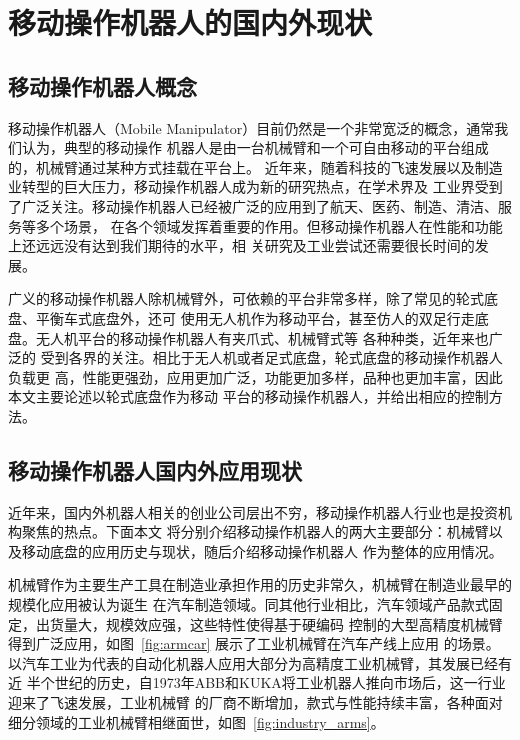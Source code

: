 
\chapter{移动操作机器人的国内外现状}
\label{cha:intro}

\section{移动操作机器人概念}
\label{cha:base_comcept}

移动操作机器人（Mobile Manipulator）目前仍然是一个非常宽泛的概念，通常我们认为，典型的移动操作
机器人是由一台机械臂和一个可自由移动的平台组成的，机械臂通过某种方式挂载在平台上\cite{bostelman2016survey}。
近年来，随着科技的飞速发展以及制造业转型的巨大压力，移动操作机器人成为新的研究热点，在学术界及
工业界受到了广泛关注\cite{schneier2015literature}。移动操作机器人已经被广泛的应用到了航天\cite{ambrose2004mobile}、医药、制造\cite{guizzo2011meka}、清洁、服务等多个场景，
在各个领域发挥着重要的作用。但移动操作机器人在性能和功能上还远远没有达到我们期待的水平，相
关研究及工业尝试还需要很长时间的发展。

广义的移动操作机器人除机械臂外，可依赖的平台非常多样，除了常见的轮式底盘、平衡车式底盘外，还可
使用无人机作为移动平台，甚至仿人的双足行走底盘。无人机平台的移动操作机器人有夹爪式、机械臂式等
各种种类，近年来也广泛的
受到各界的关注\cite{ruggiero2018aerial}。相比于无人机或者足式底盘，轮式底盘的移动操作机器人负载更
高，性能更强劲，应用更加广泛，功能更加多样，品种也更加丰富，因此本文主要论述以轮式底盘作为移动
平台的移动操作机器人，并给出相应的控制方法。

\section{移动操作机器人国内外应用现状}
\label{cha:application}

近年来，国内外机器人相关的创业公司层出不穷，移动操作机器人行业也是投资机构聚焦的热点。下面本文
将分别介绍移动操作机器人的两大主要部分：机械臂以及移动底盘的应用历史与现状，随后介绍移动操作机器人
作为整体的应用情况。

机械臂作为主要生产工具在制造业承担作用的历史非常久，机械臂在制造业最早的规模化应用被认为诞生
在汽车制造领域。同其他行业相比，汽车领域产品款式固定，出货量大，规模效应强，这些特性使得基于硬编码
控制的大型高精度机械臂得到广泛应用，如图~\ref{fig:armcar} 展示了工业机械臂在汽车产线上应用
的场景。以汽车工业为代表的自动化机器人应用大部分为高精度工业机械臂，其发展已经有近
半个世纪的历史，自1973年ABB和KUKA将工业机器人推向市场后，这一行业迎来了飞速发展，工业机械臂
的厂商不断增加，款式与性能持续丰富，各种面对细分领域的工业机械臂相继面世，如图~\ref{fig:industry_arms}。

